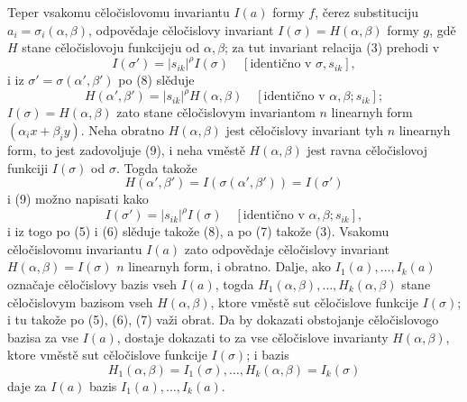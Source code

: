 \documentclass[11pt]{article}
\begin{document}
Teper vsakomu cěločislovomu invariantu \(I(a)\) formy \(f\), čerez substituciju \(a_i=\sigma_i(\alpha,\beta)\), odpovědaje cěločislovy invariant \(I(\sigma)=H(\alpha,\beta)\) formy \(g\), gdě \(H\) stane cěločislovoju funkcijeju od \(\alpha,\beta\); za tut invariant relacija (3) prehodi v
\begin{equation}
        I(\sigma')=|s_{ik}|^\rho I(\sigma)
        \quad [\text{identično v \(\sigma,s_{ik}\)}],
\end{equation}
i iz \(\sigma'=\sigma(\alpha',\beta')\) po (8) slěduje
\begin{equation}
        H(\alpha',\beta')=|s_{ik}|^\rho H(\alpha,\beta)
        \quad [\text{identično v \(\alpha,\beta;s_{ik}\)}];
\end{equation}
\(I(\sigma)=H(\alpha,\beta)\) zato stane cěločislovym invariantom \(n\) linearnyh form \((\alpha_i x+\beta_i y)\). Neha obratno \(H(\alpha,\beta)\) jest cěločislovy invariant tyh \(n\) linearnyh form, to jest zadovoljuje (9), i neha vměstě \(H(\alpha,\beta)\) jest ravna cěločislovoj funkciji \(I(\sigma)\) od \(\sigma\). Togda takože
\[
        H(\alpha',\beta')=I(\sigma(\alpha',\beta'))=I(\sigma')
\]
i (9) možno napisati kako
\begin{equation*}
        I(\sigma')=|s_{ik}|^\rho I(\sigma)
        \quad [\text{identično v \(\alpha,\beta;s_{ik}\)}],\tag{9a}
\end{equation*}
i iz togo po (5) i (6) slěduje takože (8), a po (7) takože (3). Vsakomu cěločislovomu invariantu \(I(a)\) zato odpovědaje cěločislovy invariant \(H(\alpha,\beta)=I(\sigma)\) \(n\) linearnyh form, i obratno. Dalje, ako \(I_1(a),\ldots,I_k(a)\) označaje cěločislovy bazis vseh \(I(a)\), togda \(H_1(\alpha,\beta),\ldots,H_k(\alpha,\beta)\) stane cěločislovym bazisom vseh \(H(\alpha,\beta)\), ktore vměstě sut cěločislove funkcije \(I(\sigma)\); i tu takože po (5), (6), (7) važi obrat. Da by dokazati obstojanje cěločislovogo bazisa za vse \(I(a)\), dostaje dokazati to za vse cěločislove invarianty \(H(\alpha,\beta)\), ktore vměstě sut cěločislove funkcije \(I(\sigma)\); i bazis
\[
        H_1(\alpha,\beta)=I_1(\sigma),\ldots,H_k(\alpha,\beta)=I_k(\sigma)
\]
daje za \(I(a)\) bazis \(I_1(a),\ldots,I_k(a)\).
\end{document}
